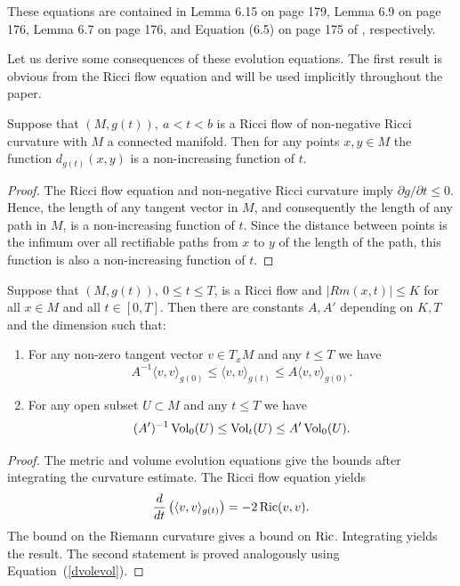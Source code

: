 These equations are contained in Lemma 6.15  on page 179, Lemma 6.9
 on page 176,  Lemma 6.7 on page 176, and Equation (6.5) on
page 175 of \cite{ChowKnopf}, respectively.


Let us derive some consequences of these evolution equations.
The first result is obvious from the Ricci flow equation and will be used implicitly throughout
the paper.

\begin{lemma}\label{lem:distance-nonincreasing}


\label{posdistdec}

Suppose that $(M,g(t)),\ a<t<b$ is a Ricci flow of non-negative Ricci curvature
with $M$ a connected manifold.
Then for any points $x,y\in M$ the function $d_{g(t)}(x,y)$ is a non-increasing function of $t$.
\end{lemma}


\begin{proof}
\sketch The Ricci flow equation and non-negative Ricci curvature imply
$\partial g/\partial t\le 0$. Hence, the length of any tangent vector in $M$, and consequently the length
of any path in $M$, is a non-increasing function of $t$. Since the distance between points is the infimum
over all rectifiable paths from $x$ to $y$ of the length of the path, this function is also a non-increasing function
of $t$.
\end{proof}



\begin{lemma}\label{lem:metric-volume-distortion}


Suppose that $(M,g(t)),\ 0\le t\le T$, is a Ricci flow and
$|Rm(x,t)|\le K$ for all $x\in M$ and all $t\in [0,T]$. Then there
are constants $A,A'$  depending on $K,T$ and the dimension such
that:
\begin{enumerate}
\item For any non-zero tangent vector $v\in T_xM$ and any $t\le T$ we have
$$A^{-1}\langle v,v\rangle_{g(0)}\le \langle v,v\rangle_{g(t)}\le A\langle
v,v\rangle_{g(0)}.$$
\item For any open subset $U\subset M$ and any $t\le T$ we have
$$(A')^{-1}\operatorname{Vol}_0(U)\le \operatorname{Vol}_t(U)\le A'\operatorname{Vol}_0(U).$$
\end{enumerate}
\end{lemma}

\begin{proof}
\sketch The metric and volume evolution equations give the bounds after
integrating the curvature estimate.
The Ricci flow equation yields
$$\frac{d}{dt}\left(\langle v,v\rangle_{g(t)}\right)=-2\operatorname{Ric}(v,v).$$
The bound on the Riemann curvature gives a bound on $\operatorname{Ric}$.
Integrating yields the result. The second statement is proved
analogously using Equation~(\ref{dvolevol}).
\end{proof}



